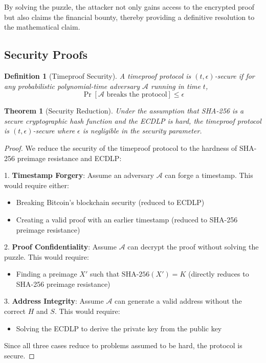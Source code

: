 \documentclass[12pt]{report}
\newtheorem{theorem}{Theorem}
\newtheorem{definition}{Definition}
\begin{document}
By solving the puzzle, the attacker not only gains access to the encrypted proof but also claims the financial bounty, thereby providing a definitive resolution to the mathematical claim.

\subsection{Security Proofs}
\begin{definition}[Timeproof Security]
A timeproof protocol is \((t, \epsilon)\)-secure if for any probabilistic polynomial-time adversary \(\mathcal{A}\) running in time \(t\),
\[
\Pr[\mathcal{A} \text{ breaks the protocol}] \leq \epsilon
\]
\end{definition}

\begin{theorem}[Security Reduction]
Under the assumption that SHA-256 is a secure cryptographic hash function and the ECDLP is hard, the timeproof protocol is \((t, \epsilon)\)-secure where \(\epsilon\) is negligible in the security parameter.
\end{theorem}

\begin{proof}
We reduce the security of the timeproof protocol to the hardness of SHA-256 preimage resistance and ECDLP:

1. \textbf{Timestamp Forgery}: 
Assume an adversary \(\mathcal{A}\) can forge a timestamp. This would require either:
\begin{itemize}
    \item Breaking Bitcoin's blockchain security (reduced to ECDLP)
    \item Creating a valid proof with an earlier timestamp (reduced to SHA-256 preimage resistance)
\end{itemize}

2. \textbf{Proof Confidentiality}:
Assume \(\mathcal{A}\) can decrypt the proof without solving the puzzle. This would require:
\begin{itemize}
    \item Finding a preimage \(X'\) such that \(\text{SHA-256}(X') = K\) (directly reduces to SHA-256 preimage resistance)
\end{itemize}

3. \textbf{Address Integrity}:
Assume \(\mathcal{A}\) can generate a valid address without the correct \(H\) and \(S\). This would require:
\begin{itemize}
    \item Solving the ECDLP to derive the private key from the public key
\end{itemize}

Since all three cases reduce to problems assumed to be hard, the protocol is secure.
\end{proof}
\end{document}
